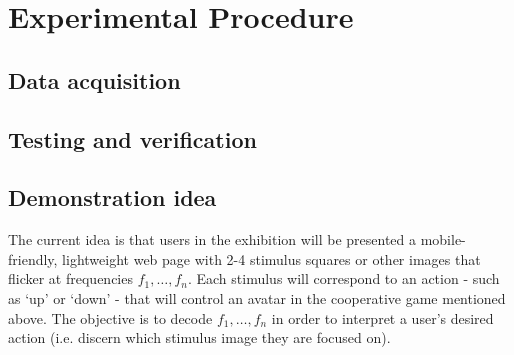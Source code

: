 \section{Experimental Procedure}
\subsection{Data acquisition}
\subsection{Testing and verification}

\subsection{Demonstration idea}
The current idea is that users in the exhibition will be presented a mobile-friendly, lightweight web page with 2-4 stimulus squares or other images that flicker at frequencies $f_1, \dots, f_n$. Each stimulus will correspond to an action - such as `up' or `down' - that will control an avatar in the cooperative game mentioned above. The objective is to decode $f_1, \dots, f_n$ in order to interpret a user's desired action (i.e. discern which stimulus image they are focused on).
